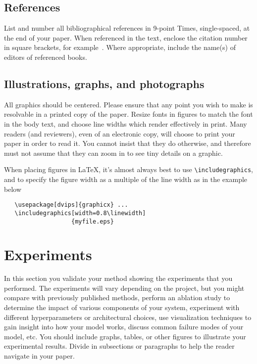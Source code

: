 \documentclass[10pt,twocolumn,letterpaper]{article}
\begin{document}
\subsection{References}
List and number all bibliographical references in 9-point Times,
single-spaced, at the end of your paper. When referenced in the text,
enclose the citation number in square brackets, for
example~\cite{Authors14}.  Where appropriate, include the name(s) of
editors of referenced books.
\subsection{Illustrations, graphs, and photographs}
All graphics should be centered.  Please ensure that any point you wish to
make is resolvable in a printed copy of the paper.  Resize fonts in figures
to match the font in the body text, and choose line widths which render
effectively in print.  Many readers (and reviewers), even of an electronic
copy, will choose to print your paper in order to read it.  You cannot
insist that they do otherwise, and therefore must not assume that they can
zoom in to see tiny details on a graphic.

When placing figures in \LaTeX, it's almost always best to use
\verb+\includegraphics+, and to specify the  figure width as a multiple of
the line width as in the example below
{\small\begin{verbatim}
   \usepackage[dvips]{graphicx} ...
   \includegraphics[width=0.8\linewidth]
                   {myfile.eps}
\end{verbatim}
}

\section{Experiments}
In this section you validate your method showing the experiments that you performed. The experiments will vary depending on the project, but you might compare with previously published methods, perform an ablation study to determine the impact of various components of your system, experiment with different hyperparameters or architectural choices, use visualization techniques to gain insight into how your model works, discuss common failure modes of your model, etc. You should include graphs, tables, or other figures to illustrate your experimental results. Divide in subsections or paragraphs to help the reader navigate in your paper.
\end{document}
